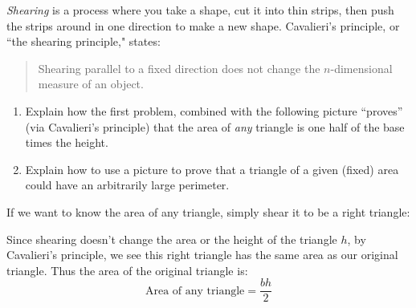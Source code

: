 \documentclass[nooutcomes,noauthor,handout,hints]{ximera}
\begin{document}
\begin{question}
  \emph{Shearing} is a process where you take a shape, cut it into thin strips, 
  then push the strips around in one direction to make a new shape.  
  Cavalieri's principle, or ``the shearing principle," states:
  \begin{quote}
    Shearing parallel to a fixed direction does not change the
    $n$-dimensional measure of an object.
  \end{quote}
 \begin{enumerate}
  \item Explain how the first problem, combined with the following
  picture ``proves'' (via Cavalieri's principle) that the area of \emph{any}
  triangle is one half of the base times the height.
  \begin{center}
  \end{center}
  \vfill 
  \item Explain how to use a picture to prove that a triangle of a
    given (fixed) area could have an arbitrarily large perimeter.
    \vfill \vfill
  \end{enumerate}
  
  \begin{freeResponse}
    If we want to know the area of any triangle, simply shear it to be a right triangle:
      \begin{center}
      \end{center}
    Since shearing doesn't change the area or the height of the
    triangle $h$, by Cavalieri's principle, we see this right triangle
    has the same area as our original triangle. Thus the area of the
    original triangle is:
    \[
    \text{Area of any triangle} = \frac{bh}{2}
    \]
  \end{freeResponse}
\end{question}
\end{document}
